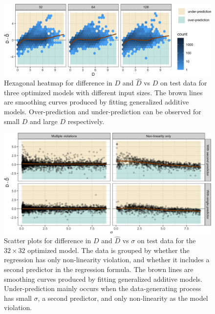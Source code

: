 \documentclass[]{interact}
\theoremstyle{plain}%
\theoremstyle{definition}
\theoremstyle{remark}
\begin{document}
\begin{figure}[!h]

{\centering \includegraphics[width=1\linewidth]{paper_files/figure-latex/model-performance-1} 

}

\caption{Hexagonal heatmap for difference in $D$ and $\hat{D}$ vs $D$ on test data for three optimized models with different input sizes. The brown lines are smoothing curves produced by fitting generalized additive models. Over-prediction and under-prediction can be observed for small $D$ and large $D$ respectively.}\label{fig:model-performance}
\end{figure}

\begin{figure}[!h]

{\centering \includegraphics[width=1\linewidth]{paper_files/figure-latex/over-under-1} 

}

\caption{Scatter plots for difference in $D$ and $\hat{D}$ vs $\sigma$ on test data for the $32 \times 32$ optimized model. The data is grouped by whether the regression has only non-linearity violation, and whether it includes a second predictor in the regression formula. The brown lines are smoothing curves produced by fitting generalized additive models. Under-prediction mainly occurs when the data-generating process has small $\sigma$, a second predictor, and only non-linearity as the model violation.}\label{fig:over-under}
\end{figure}
\end{document}

